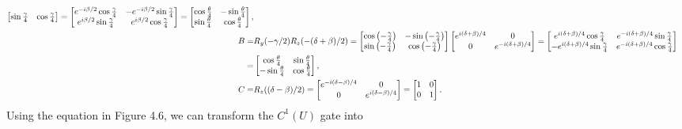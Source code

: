 \documentclass[en]{sol-man}
\begin{document}
\begin{sol}
\begin{align}
\begin{bmatrix}
            \sin\frac{\gamma}{4}&\cos\frac{\gamma}{4}
        \end{bmatrix}=\begin{bmatrix}
            e^{-i\beta/2}\cos\frac{\gamma}{4}&-e^{-i\beta/2}\sin\frac{\gamma}{4}\\
            e^{i\beta/2}\sin\frac{\gamma}{4}&e^{i\beta/2}\cos\frac{\gamma}{4}
        \end{bmatrix}=\begin{bmatrix}
            \cos\frac{\theta}{4}&-\sin\frac{\theta}{4}\\
            \sin\frac{\theta}{4}&\cos\frac{\theta}{4}
        \end{bmatrix},\\
        \notag B=&R_y(-\gamma/2)R_z(-(\delta+\beta)/2)=\begin{bmatrix}
            \cos\left(-\frac{\gamma}{4}\right)&-\sin\left(-\frac{\gamma}{4}\right)\\
            \sin\left(-\frac{\gamma}{4}\right)&\cos\left(-\frac{\gamma}{4}\right)
        \end{bmatrix}\begin{bmatrix}
            e^{i(\delta+\beta)/4}&0\\
            0&e^{-i(\delta+\beta)/4}
        \end{bmatrix}=\begin{bmatrix}
            e^{i(\delta+\beta)/4}\cos\frac{\gamma}{4}&e^{-i(\delta+\beta)/4}\sin\frac{\gamma}{4}\\
            -e^{i(\delta+\beta)/4}\sin\frac{\gamma}{4}&e^{-i(\delta+\beta)/4}\cos\frac{\gamma}{4}
        \end{bmatrix}\\
        =&\begin{bmatrix}
            \cos\frac{\theta}{4}&\sin\frac{\theta}{4}\\
            -\sin\frac{\theta}{4}&\cos\frac{\theta}{4}
        \end{bmatrix},\\
        C=&R_z((\delta-\beta)/2)=\begin{bmatrix}
            e^{-i(\delta-\beta)/4}&0\\
            0&e^{i(\delta-\beta)/4}
        \end{bmatrix}=\begin{bmatrix}
            1&0\\
            0&1
        \end{bmatrix}.
    \end{align}
    Using the equation in Figure 4.6, we can transform the $C^1(U)$ gate into

\end{sol}
\end{document}
